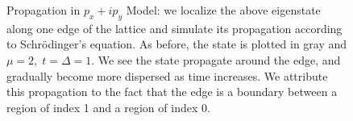 \documentclass[a4paper]{article}
\begin{document}
\begin{figure}
%
%

%
%
\caption{Propagation in $p_x + ip_y$ Model: we localize the above eigenstate along one edge of the lattice and simulate its propagation according to Schr{\"o}dinger's equation.
As before, the state is plotted in gray and $\mu = 2,\; t = \Delta = 1$.
We see the state propagate around the edge, and gradually become more dispersed as time increases.
We attribute this propagation to the fact that the edge is a boundary between a region of index 1 and a region of index 0.
}%
\label{fig:pxipy_prop}%
\end{figure}
\end{document}
